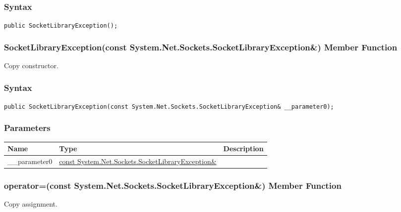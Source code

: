 \documentclass[a4paper,oneside,11.000000pt]{book}
\begin{document}
\subsubsection*{Syntax}
\texttt{public SocketLibraryException();}
\clearpage

\hypertarget{System.Net.Sockets.SocketLibraryException.constructor.P.System.Net.Sockets.SocketLibraryException.C.R.System.Net.Sockets.SocketLibraryException}{\subsubsection*{SocketLibraryException(const System.Net.Sockets.SocketLibraryException\&) Member Function}}\begin{flushleft}
Copy constructor.

\end{flushleft}
\subsubsection*{Syntax}
\texttt{public SocketLibraryException(const System.Net.Sockets.SocketLibraryException\& \_\_parameter0);}
\subsubsection*{Parameters}
\begin{flushleft}
\begin{supertabular}[l]{!{\raggedright}p{2.61335cm}!{\raggedright}p{7.25332cm}!{\raggedright}p{2.65538cm}}
\textbf{Name}
& \textbf{Type}
& \textbf{Description}
\\
\hline
\_\_parameter0
& \hyperlink{System.Net.Sockets.SocketLibraryException}{const System.\-Net.\-Sockets.\-SocketLibraryException\&\-}
& 
\\
\end{supertabular}

\end{flushleft}
\clearpage

\hypertarget{System.Net.Sockets.SocketLibraryException.operator.assign.P.System.Net.Sockets.SocketLibraryException.C.R.System.Net.Sockets.SocketLibraryException}{\subsubsection*{operator=(const System.Net.Sockets.SocketLibraryException\&) Member Function}}\begin{flushleft}
Copy assignment.

\end{flushleft}
\end{document}
